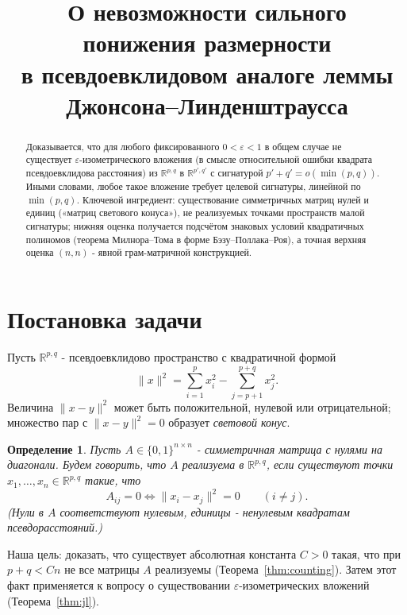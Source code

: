 \documentclass[12pt]{article}
\newtheorem{definition}{Определение}
\newcommand{\R}{\mathbb{R}}
\begin{document}
\title{О невозможности сильного понижения размерности\\ в псевдоевклидовом аналоге леммы Джонсона--Линденштраусса}
\author{}
\date{}
\maketitle

\begin{abstract}
Доказывается, что для любого фиксированного \(0<\varepsilon<1\) в общем случае не существует \(\varepsilon\)-изометрического вложения (в смысле относительной ошибки квадрата псевдоевклидова расстояния) из \(\R^{p,q}\) в \(\R^{p',q'}\) с сигнатурой \(p'+q' = o(\min(p,q))\). Иными словами, любое такое вложение требует целевой сигнатуры, линейной по \(\min(p,q)\). Ключевой ингредиент: существование симметричных матриц нулей и единиц («матриц светового конуса»), не реализуемых точками пространств малой сигнатуры; нижняя оценка получается подсчётом знаковых условий квадратичных полиномов (теорема Милнора--Тома в форме Бэзу--Поллака--Роя), а точная верхняя оценка \((n,n)\) - явной грам-матричной конструкцией.
\end{abstract}

\section{Постановка задачи}

Пусть \(\R^{p,q}\) - псевдоевклидово пространство с квадратичной формой
\[
\|x\|^2 = \sum_{i=1}^p x_i^2 - \sum_{j=p+1}^{p+q} x_j^2 .
\]
Величина \(\|x-y\|^2\) может быть положительной, нулевой или отрицательной; множество пар с \(\|x-y\|^2=0\) образует \emph{световой конус}.

\begin{definition}
Пусть \(A \in \{0,1\}^{n\times n}\) - симметричная матрица с нулями на диагонали. Будем говорить, что \(A\) \emph{реализуема} в \(\R^{p,q}\), если существуют точки \(x_1,\dots,x_n \in \R^{p,q}\) такие, что
\[
A_{ij}=0 \iff \|x_i - x_j\|^2 = 0 \qquad (i\ne j).
\]
(Нули в \(A\) соответствуют нулевым, единицы - ненулевым квадратам псевдорасстояний.)
\end{definition}

Наша цель: доказать, что существует абсолютная константа \(C>0\) такая, что при \(p+q < C n\) не все матрицы \(A\) реализуемы (Теорема~\ref{thm:counting}). Затем этот факт применяется к вопросу о существовании \(\varepsilon\)-изометрических вложений (Теорема~\ref{thm:jl}).
\end{document}
